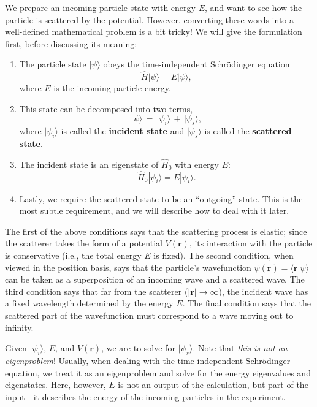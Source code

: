 \documentclass[pra,12pt]{revtex4}
\begin{document}
We prepare an incoming particle state with energy $E$, and want to see
how the particle is scattered by the potential.  However, converting
these words into a well-defined mathematical problem is a bit tricky!
We will give the formulation first, before discussing its meaning:
\begin{enumerate}
\item 
The particle state $|\psi\rangle$ obeys the time-independent
Schr\"odinger equation
\begin{equation}
  \hat{H} |\psi\rangle = E |\psi\rangle,
\end{equation}
where $E$ is the incoming particle energy.

\item
This state can be decomposed into two terms,
\begin{equation}
  |\psi\rangle \,=\, |\psi_i\rangle \,+\, |\psi_s\rangle,
\end{equation}
where $|\psi_i\rangle$ is called the \textbf{incident state} and
$|\psi_s\rangle$ is called the \textbf{scattered state}.

\item
The incident state is an eigenstate of $\hat{H}_0$ with energy $E$:
\begin{equation}
  \hat{H}_0 |\psi_i\rangle = E |\psi_i\rangle.
\end{equation}

\item
Lastly, we require the scattered state to be an ``outgoing'' state.
This is the most subtle requirement, and we will describe how to deal
with it later.
\end{enumerate}
The first of the above conditions says that the scattering process is
elastic; since the scatterer takes the form of a potential
$V(\mathbf{r})$, its interaction with the particle is conservative
(i.e., the total energy $E$ is fixed).  The second condition, when
viewed in the position basis, says that the particle's wavefunction
$\psi(\mathbf{r}) = \langle \mathbf{r} |\psi\rangle$ can be taken as a
superposition of an incoming wave and a scattered wave.  The third
condition says that far from the scatterer ($|\mathbf{r}|\rightarrow
\infty$), the incident wave has a fixed wavelength determined by the
energy $E$.  The final condition says that the scattered part of the
wavefunction must correspond to a wave moving out to infinity.

Given $|\psi_i\rangle$, $E$, and $V(\mathbf{r})$, we are to solve for
$|\psi_s\rangle$.  Note that \textit{this is not an eigenproblem}!
Usually, when dealing with the time-independent Schr\"odinger
equation, we treat it as an eigenproblem and solve for the energy
eigenvalues and eigenstates.  Here, however, $E$ is not an output of
the calculation, but part of the input---it describes the energy of
the incoming particles in the experiment.
\end{document}
